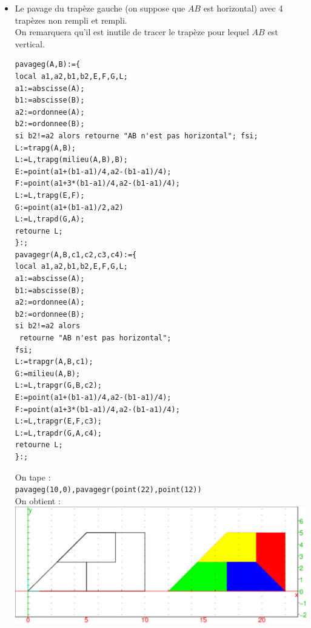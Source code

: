 \documentclass[a4paper,11pt]{book}
\begin{document}
\begin{itemize}
\item Le pavage  du trap\`eze gauche (on suppose que $AB$ est horizontal) avec 
4 trap\`ezes non rempli et rempli.\\
On remarquera qu'il est inutile de tracer le trap\`eze pour lequel $AB$ est 
vertical.  
\begin{verbatim}
pavageg(A,B):={
local a1,a2,b1,b2,E,F,G,L;
a1:=abscisse(A);
b1:=abscisse(B);
a2:=ordonnee(A);
b2:=ordonnee(B);
si b2!=a2 alors retourne "AB n'est pas horizontal"; fsi;
L:=trapg(A,B);
L:=L,trapg(milieu(A,B),B);
E:=point(a1+(b1-a1)/4,a2-(b1-a1)/4);
F:=point(a1+3*(b1-a1)/4,a2-(b1-a1)/4);
L:=L,trapg(E,F);
G:=point(a1+(b1-a1)/2,a2)
L:=L,trapd(G,A);
retourne L;
}:;
pavagegr(A,B,c1,c2,c3,c4):={
local a1,a2,b1,b2,E,F,G,L;
a1:=abscisse(A);
b1:=abscisse(B);
a2:=ordonnee(A);
b2:=ordonnee(B);
si b2!=a2 alors 
 retourne "AB n'est pas horizontal"; 
fsi;
L:=trapgr(A,B,c1);
G:=milieu(A,B);
L:=L,trapgr(G,B,c2);
E:=point(a1+(b1-a1)/4,a2-(b1-a1)/4);
F:=point(a1+3*(b1-a1)/4,a2-(b1-a1)/4);
L:=L,trapgr(E,F,c3);
L:=L,trapdr(G,A,c4);
retourne L;
}:;
\end{verbatim}
On tape :\\
{\tt pavageg(10,0),pavagegr(point(22),point(12))}\\
On obtient :\\
\includegraphics[width=\textwidth]{pavagegr}


\end{itemize}
\end{document}
